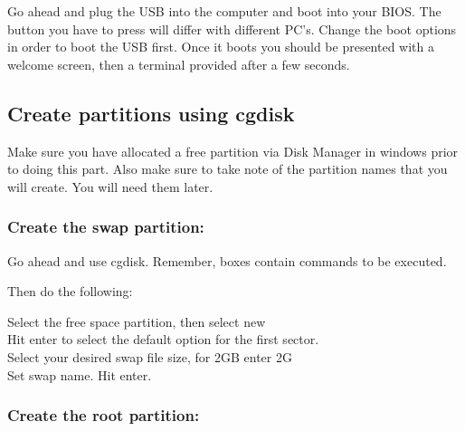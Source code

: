 \documentclass[12pt]{article}
\newcommand{\bbox}{ %
\collectbox{\color{green}\setlength{\fboxsep}{8pt} \fbox{\BOXCONTENT}}}
\newcommand{\s}{\vspace{0.3cm}} %
\begin{document}
\begin{adjustwidth}{0.5cm}{}
Go ahead and plug the USB into the computer and boot into your BIOS. The button you have to press will differ with different PC's. Change the boot options in order to boot the USB first. Once it boots you should be presented with a welcome screen, then a terminal provided after a few seconds.
\end{adjustwidth}
\color{pink}
\subsection*{Create partitions using cgdisk} \color{white}

\begin{adjustwidth}{0.5cm}{}
Make sure you have allocated a free partition via Disk Manager in windows prior to doing this part. Also make sure to take note of the partition names that you will create. You will need them later.
\end{adjustwidth}
\color{pink}
\subsubsection*{Create the swap partition:} \color{white}

\begin{adjustwidth}{0.5cm}{} %
Go ahead and use cgdisk. Remember, boxes contain commands to be executed. \s \\
\bbox{cgdisk} \s
\end{adjustwidth}

\begin{adjustwidth}{0.5cm}{}
Then do the following:\\
\begin{adjustwidth}{0.5cm}{}
Select the free space partition, then select new\\
Hit enter to select the default option for the first sector.\\
Select your desired swap file size, for 2GB enter 2G\\
Set swap name. Hit enter.

\end{adjustwidth}
\end{adjustwidth}
\color{pink}
\subsubsection*{Create the root partition:} \color{white}
\end{document}
